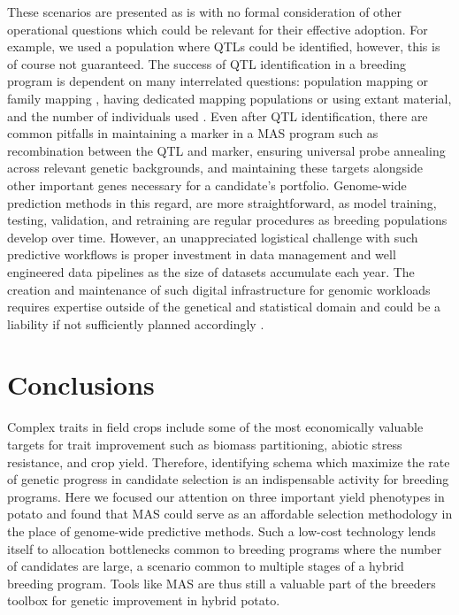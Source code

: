 These scenarios are presented as is with no formal consideration of
other operational questions which could be relevant for their effective
adoption. For example, we used a population where QTLs could be
identified, however, this is of course not guaranteed. The success of
QTL identification in a breeding program is dependent on many
interrelated questions: population mapping or family mapping
\autocite{Wurschum2012}, having dedicated mapping populations or using
extant material, and the number of individuals used
\autocite{Lande1990}. Even after QTL identification, there are common
pitfalls in maintaining a marker in a MAS program such as recombination
between the QTL and marker, ensuring universal probe annealing across
relevant genetic backgrounds, and maintaining these targets alongside
other important genes necessary for a candidate's portfolio. Genome-wide
prediction methods in this regard, are more straightforward, as model
training, testing, validation, and retraining are regular procedures as
breeding populations develop over time. However, an unappreciated
logistical challenge with such predictive workflows is proper investment
in data management and well engineered data pipelines as the size of
datasets accumulate each year. The creation and maintenance of such
digital infrastructure for genomic workloads requires expertise outside
of the genetical and statistical domain and could be a liability if not
sufficiently planned accordingly \autocite{ODriscoll2013,Mulder2017}.

\section{Conclusions} %

Complex traits in field crops include some of the most economically
valuable targets for trait improvement such as biomass partitioning, abiotic
stress resistance, and crop yield. Therefore, identifying schema which
maximize the rate of genetic progress in candidate selection is an
indispensable activity for breeding programs. Here we focused our attention 
on three important yield phenotypes in potato and found that MAS could serve
as an affordable selection methodology in the place of genome-wide predictive
methods. Such a low-cost technology lends itself to allocation bottlenecks common
to breeding programs where the number of candidates are large, a scenario common to 
multiple stages of a hybrid breeding program. Tools like MAS are thus still a valuable part of the
 breeders toolbox for genetic improvement in hybrid potato.
